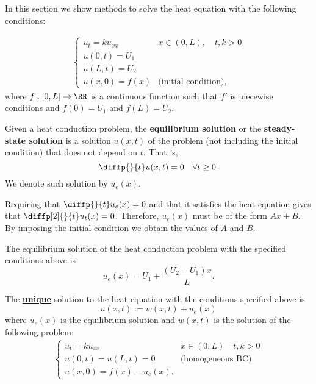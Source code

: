\documentclass[12pt, a4paper]{article}
\begin{document}
In this section we show methods to solve the heat equation with the following conditions:

\[\begin{aligned}
    \begin{cases}
        u_t = ku_{xx} & x \in (0,L), \quad t,k>0 \\
        u(0,t)=U_1 \\
        u(L,t)=U_2  \\
        u(x,0)=f(x) & \text{(initial condition)},
    \end{cases}
\end{aligned}\]
where \(f:[0,L] \to \RR\) is a continuous function such that \(f'\) is piecewise conditions and \(f(0)=U_1\) and \(f(L)=U_2\).

\begin{definition}
    Given a heat conduction problem, the \textbf{equilibrium solution} or the \textbf{steady-state solution} is a solution \(u(x,t)\) of the problem (not including the initial condition) that does not depend on \(t\). That is, 
    \[\diffp{}{t}u(x,t) =0 \quad \forall t \geq 0.\]
    We denote such solution by \(u_e(x)\).
\end{definition}

\begin{mdremark}
    Requiring that \(\diffp{}{t}u_e(x) =0\) and that it satisfies the heat equation gives that \(\diffp[2]{}{t}u_t(x) = 0\). Therefore, \(u_e(x)\) must be of the form \(Ax+B\). By imposing the initial condition we obtain the values of \(A\) and \(B\).
\end{mdremark}

\begin{mdthm}
    The equilibrium solution of the heat conduction problem with the specified conditions above is 
    \[u_e(x)=U_1 +\frac{(U_2-U_1)x}{L}.\]
\end{mdthm}

\begin{mdthm}
    The \underline{\textbf{unique}} solution to the heat equation with the conditions specified above is 
    \[u(x,t):= w(x,t)+u_e(x)\]
    where \(u_e(x)\) is the equilibrium solution and \(w(x,t)\) is the solution of the following problem:
    \[\begin{aligned}
        \begin{cases}
            u_t =ku_{xx} & x\in (0,L) \quad t,k>0 \\
            u(0,t)=u(L,t)=0 &\text{(homogeneous BC)}\\
            u(x,0) =f(x)-u_e(x).
        \end{cases}
    \end{aligned}\]
\end{mdthm}
\end{document}
